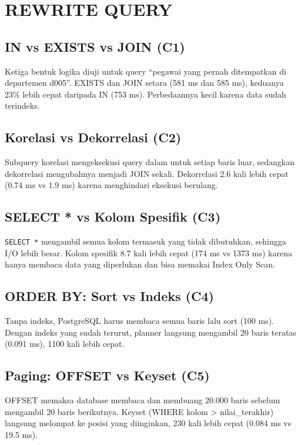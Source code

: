 \chapter{REWRITE QUERY}

\section{IN vs EXISTS vs JOIN (C1)}
Ketiga bentuk logika diuji untuk query ``pegawai yang pernah ditempatkan di departemen d005''. EXISTS dan JOIN setara (581 ms dan 585 ms), keduanya 23\% lebih cepat daripada IN (753 ms). Perbedaannya kecil karena data sudah terindeks.


\section{Korelasi vs Dekorrelasi (C2)}
Subquery korelasi mengeksekusi query dalam untuk setiap baris luar, sedangkan dekorrelasi mengubahnya menjadi JOIN sekali. Dekorrelasi 2.6 kali lebih cepat (0.74 ms vs 1.9 ms) karena menghindari eksekusi berulang.


\section{SELECT * vs Kolom Spesifik (C3)}
\texttt{SELECT *} mengambil semua kolom termasuk yang tidak dibutuhkan, sehingga I/O lebih besar. Kolom spesifik 8.7 kali lebih cepat (174 ms vs 1373 ms) karena hanya membaca data yang diperlukan dan bisa memakai Index Only Scan.


\section{ORDER BY: Sort vs Indeks (C4)}
Tanpa indeks, PostgreSQL harus membaca semua baris lalu sort (100 ms). Dengan indeks yang sudah terurut, planner langsung mengambil 20 baris teratas (0.091 ms), 1100 kali lebih cepat.


\section{Paging: OFFSET vs Keyset (C5)}
OFFSET memaksa database membaca dan membuang 20.000 baris sebelum mengambil 20 baris berikutnya. Keyset (WHERE kolom > nilai\_terakhir) langsung melompat ke posisi yang diinginkan, 230 kali lebih cepat (0.084 ms vs 19.5 ms).

